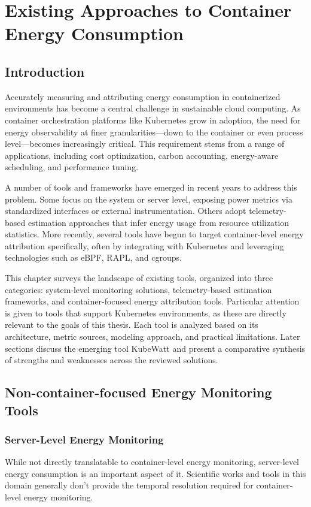 \chapter{Existing Approaches to Container Energy Consumption}
\label{chap:tool-analysis}

\section{Introduction}
\label{sec:tool-intro}

Accurately measuring and attributing energy consumption in containerized environments has become a central challenge in sustainable cloud computing. As container orchestration platforms like Kubernetes grow in adoption, the need for energy observability at finer granularities—down to the container or even process level—becomes increasingly critical. This requirement stems from a range of applications, including cost optimization, carbon accounting, energy-aware scheduling, and performance tuning.

A number of tools and frameworks have emerged in recent years to address this problem. Some focus on the system or server level, exposing power metrics via standardized interfaces or external instrumentation. Others adopt telemetry-based estimation approaches that infer energy usage from resource utilization statistics. More recently, several tools have begun to target container-level energy attribution specifically, often by integrating with Kubernetes and leveraging technologies such as eBPF, RAPL, and cgroups.

This chapter surveys the landscape of existing tools, organized into three categories: system-level monitoring solutions, telemetry-based estimation frameworks, and container-focused energy attribution tools. Particular attention is given to tools that support Kubernetes environments, as these are directly relevant to the goals of this thesis. Each tool is analyzed based on its architecture, metric sources, modeling approach, and practical limitations. Later sections discuss the emerging tool KubeWatt and present a comparative synthesis of strengths and weaknesses across the reviewed solutions.

\section{Non-container-focused Energy Monitoring Tools}
\label{sec:non-k8s-tools}
\subsection{Server-Level Energy Monitoring}
\label{sec:server-tools}
While not directly translatable to container-level energy monitoring, server-level energy consumption is an important aspect of it. Scientific works and tools in this domain generally don't provide the temporal resolution required for container-level energy monitoring.

